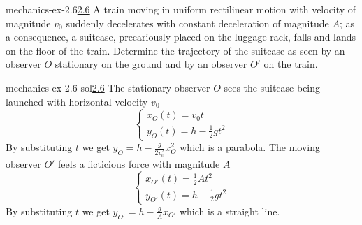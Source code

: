 \documentclass[preview]{standalone}
\begin{document}
\begin{snippetexercise}{mechanics-ex-2.6}{\underline{2.6}}
    A train moving in uniform rectilinear motion with velocity of magnitude \(v_0\) suddenly decelerates with
    constant deceleration of magnitude \(A\); as a consequence, a suitcase, precariously placed on the luggage rack,
    falls and lands on the floor of the train.
    Determine the trajectory of the suitcase as seen by an observer \(O\) stationary on the ground and by an
    observer \(O'\) on the train.
\end{snippetexercise}

\begin{snippetsolution}{mechanics-ex-2.6-sol}{\underline{2.6}}
    The stationary observer \(O\) sees the suitcase being launched with horizontal velocity \(v_0\)
    \[
        \begin{cases}
            x_O(t) = v_0 t \\
            y_O(t) = h- \frac{1}{2}gt^2
        \end{cases}
    \]
    By substituting \(t\) we get \(y_O = h-\frac{g}{2v_0^2} x_O^2\) which is a parabola.
    The moving observer \(O'\) feels a ficticious force with magnitude \(A\)
    \[
        \begin{cases}
            x_{O'}(t) = \frac{1}{2}At^2 \\
            y_{O'}(t) = h- \frac{1}{2}gt^2
        \end{cases}
    \]
    By substituting \(t\) we get \(y_{O'} = h-\frac{g}{A}x_{O'}\) which is a straight line.
\end{snippetsolution}
\end{document}
